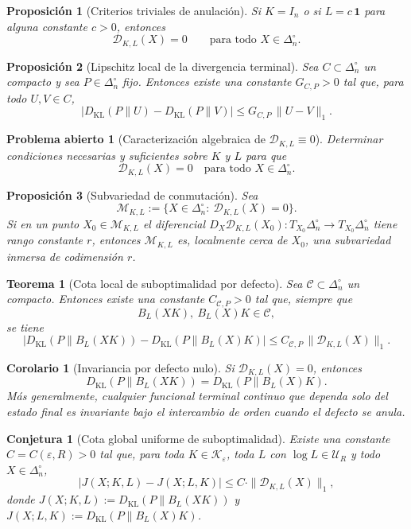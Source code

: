 \documentclass[12pt]{article}
\newtheorem{proposicion}{Proposición}[section]
\newtheorem{teorema}{Teorema}[section]
\newtheorem{corolario}{Corolario}[section]
\newtheorem{conjetura}{Conjetura}[section]
\newtheorem{problema}{Problema abierto}[section]
\begin{document}
\begin{proposicion}[Criterios triviales de anulación]\label{prop:defecto-trivial}
Si $K=I_n$ o si $L=c\,\mathbf 1$ para alguna constante $c>0$, entonces
\[
\mathcal D_{K,L}(X)=0
\qquad\text{para todo }X\in\Delta_n^\circ.
\]
\end{proposicion}

\begin{proposicion}[Lipschitz local de la divergencia terminal]\label{prop:lipschitz-terminal}
Sea $C\subset\Delta_n^\circ$ un compacto y sea $P\in\Delta_n^\circ$ fijo.
Entonces existe una constante $G_{C,P}>0$ tal que, para todo $U,V\in C$,
\[
\bigl|D_{\mathrm{KL}}(P\|U)-D_{\mathrm{KL}}(P\|V)\bigr|
\le G_{C,P}\,\|U-V\|_1.
\]
\end{proposicion}

\begin{problema}[Caracterización algebraica de $\mathcal D_{K,L}\equiv 0$]\label{prob:conmutacion}
Determinar condiciones necesarias y suficientes sobre $K$ y $L$ para que
\[
\mathcal D_{K,L}(X)=0
\quad\text{para todo }X\in\Delta_n^\circ.
\]
\end{problema}

\begin{proposicion}[Subvariedad de conmutación]\label{prop:subvariedad}
Sea
\[
\mathcal M_{K,L}:=\bigl\{X\in\Delta_n^\circ:\ \mathcal D_{K,L}(X)=0\bigr\}.
\]
Si en un punto $X_0\in\mathcal M_{K,L}$ el diferencial
$D_X\mathcal D_{K,L}(X_0):T_{X_0}\Delta_n^\circ\to T_{X_0}\Delta_n^\circ$
tiene rango constante $r$, entonces $\mathcal M_{K,L}$ es, localmente cerca de
$X_0$, una subvariedad inmersa de codimensión $r$.
\end{proposicion}

\begin{teorema}[Cota local de suboptimalidad por defecto]\label{teo:cota-defecto}
Sea $\mathcal C\subset\Delta_n^\circ$ un compacto. Entonces existe una
constante $C_{\mathcal C,P}>0$ tal que, siempre que
\[
B_L(XK),\ B_L(X)K\in\mathcal C,
\]
se tiene
\[
\bigl|D_{\mathrm{KL}}(P\|B_L(XK)) - D_{\mathrm{KL}}(P\|B_L(X)K)\bigr|
\le
C_{\mathcal C,P}\,\|\mathcal D_{K,L}(X)\|_1.
\]
\end{teorema}

\begin{corolario}[Invariancia por defecto nulo]
Si $\mathcal{D}_{K,L}(X)=0$, entonces
\[
D_{\mathrm{KL}}(P\|B_L(XK))=D_{\mathrm{KL}}(P\|B_L(X)K).
\]
Más generalmente, cualquier funcional terminal continuo que dependa solo del
estado final es invariante bajo el intercambio de orden cuando el defecto se
anula.
\end{corolario}

\begin{conjetura}[Cota global uniforme de suboptimalidad]\label{conj:cota-global}
Existe una constante $C=C(\varepsilon,R)>0$ tal que, para toda
$K\in\mathcal K_\varepsilon$, toda $L$ con $\log L\in\mathcal U_R$ y todo
$X\in\Delta_n^\circ$,
\[
\bigl|J(X;K,L)-J(X;L,K)\bigr|
\le
C\cdot\|\mathcal D_{K,L}(X)\|_1,
\]
donde $J(X;K,L):=D_{\mathrm{KL}}(P\|B_L(XK))$ y
$J(X;L,K):=D_{\mathrm{KL}}(P\|B_L(X)K)$.
\end{conjetura}
\end{document}
